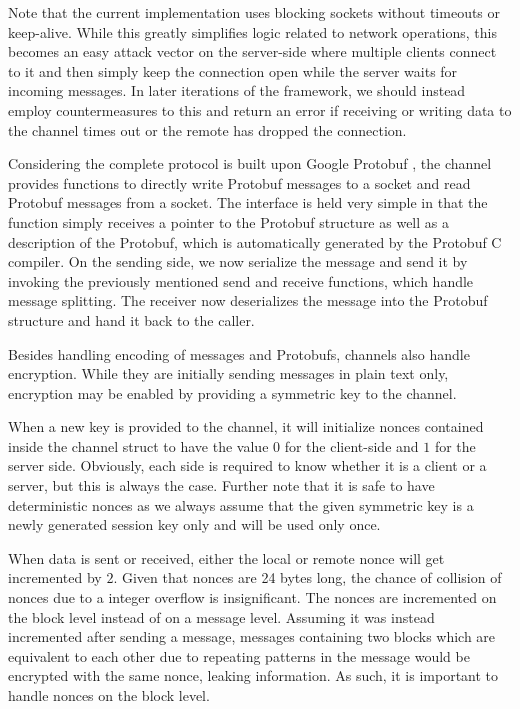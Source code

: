 Note that the current implementation uses blocking sockets without timeouts or keep-alive.
While this greatly simplifies logic related to network operations, this becomes an easy attack vector on the server-side where multiple clients connect to it and then simply keep the connection open while the server waits for incoming messages.
In later iterations of the framework, we should instead employ countermeasures to this and return an error if receiving or writing data to the channel times out or the remote has dropped the connection.

Considering the complete protocol is built upon Google Protobuf \cite{varda2008protocol}, the channel provides functions to directly write Protobuf messages to a socket and read Protobuf messages from a socket.
The interface is held very simple in that the function simply receives a pointer to the Protobuf structure as well as a description of the Protobuf, which is automatically generated by the Protobuf C compiler.
On the sending side, we now serialize the message and send it by invoking the previously mentioned send and receive functions, which handle message splitting.
The receiver now deserializes the message into the Protobuf structure and hand it back to the caller.

Besides handling encoding of messages and Protobufs, channels also handle encryption.
While they are initially sending messages in plain text only, encryption may be enabled by providing a symmetric key to the channel.

When a new key is provided to the channel, it will initialize nonces contained inside the channel struct to have the value $0$ for the client-side and $1$ for the server side.
Obviously, each side is required to know whether it is a client or a server, but this is always the case.
Further note that it is safe to have deterministic nonces as we always assume that the given symmetric key is a newly generated session key only and will be used only once.

When data is sent or received, either the local or remote nonce will get incremented by $2$.
Given that nonces are 24 bytes long, the chance of collision of nonces due to a integer overflow is insignificant.
The nonces are incremented on the block level instead of on a message level.
Assuming it was instead incremented after sending a message, messages containing two blocks which are equivalent to each other due to repeating patterns in the message would be encrypted with the same nonce, leaking information.
As such, it is important to handle nonces on the block level.

